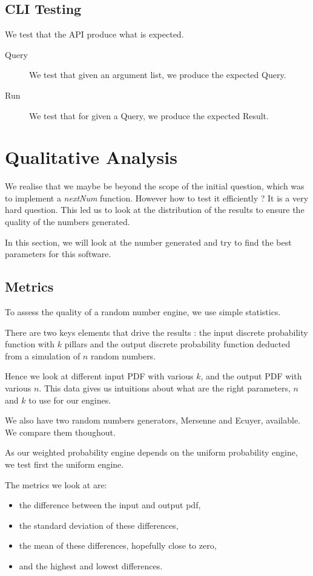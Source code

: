 \documentclass[12pt,a4paper,article]{memoir} %
\begin{document}
\subsection{CLI Testing}
We test that the API produce what is expected.
\begin{description}
	\item [Query]
	We test that given an argument list, we produce the expected
	Query.
	\item[Run]
	We test that for given a Query, we produce the expected Result.
\end{description}

\section{Qualitative Analysis}
\label{sec:quality}
We realise that we maybe be beyond the scope of the initial
question, which was to implement a \emph{nextNum} function.
However how to test it efficiently ? It is a very hard question.
This led us to look at the distribution of the results to ensure
the quality of the numbers generated.

In this section, we will look at the number generated and try
to find the best parameters for this software.

\subsection{Metrics}
To assess the quality of a random number engine, we use
simple statistics. 

There are two keys elements that drive the results :
the input discrete probability function with $k$ pillars and
the output discrete probability function deducted from a
simulation of $n$ random numbers.

Hence we look at different input PDF with various $k$,
and the output PDF with various $n$. 
This data gives us intuitions about what are the right
parameters, $n$ and $k$ to use for our engines.

We also have two random numbers generators, 
Mersenne and Ecuyer, available. We compare them thoughout.

As our weighted probability engine depends on
the uniform probability engine, we test first the uniform engine.

The metrics we look at are:
\begin{itemize}
	\item the difference between the input and output pdf,
	\item the standard deviation of these differences,
	\item the mean of these differences, hopefully close to zero,
	\item and the highest and lowest differences.
\end{itemize}
\end{document}
